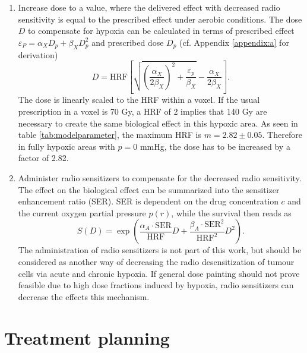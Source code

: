 \begin{enumerate}
\item Increase dose to a value, where the delivered effect with decreased radio sensitivity is equal to the prescribed effect under aerobic conditions. The dose $D$ to compensate for hypoxia can be calculated in terms of prescribed effect $\varepsilon_P = \alpha_XD_p + \beta_XD_p^2$ and prescribed dose $D_p$ (cf. Appendix \ref{appendix:a} for derivation)
\begin{equation}\label{eq:dosecompensation}
D = \mathrm{HRF}\left[\sqrt{\left(\frac{\alpha_X}{2\beta_X}\right)^2 + \frac{\varepsilon_p}{\beta_X}}-\frac{\alpha_X}{2\beta_X}\right].
\end{equation}
The dose is linearly scaled to the HRF within a voxel. If the usual prescription in a voxel is 70 Gy, a HRF of 2 implies that 140 Gy are necessary to create the same biological effect in this hypoxic area. As seen in table \ref{tab:modelparameter}, the maximum HRF is $m=2.82\pm 0.05$. Therefore in fully hypoxic areas with $p=0$ mmHg, the dose has to be increased by a factor of 2.82.
\item Administer radio sensitizers to compensate for the decreased radio sensitivity. The effect on the biological effect can be summarized into the sensitizer enhancement ratio (SER). SER is dependent on the drug concentration $c$ and the current oxygen partial pressure $p(r)$, while the survival then reads as \cite{pmid21183291}
\begin{equation}
S(D) = \exp\left(\frac{\alpha_A\cdot\mathrm{SER}}{\mathrm{HRF}}D + \frac{\beta_A\cdot\mathrm{SER}^2}{\mathrm{HRF}^2}D^2\right).
\end{equation}
The administration of radio sensitizers is not part of this work, but should be considered as another way of decreasing the radio desensitization of tumour cells via acute and chronic hypoxia. If general dose painting should not prove feasible due to high dose fractions induced by hypoxia, radio sensitizers can decrease the effects this mechanism.
\end{enumerate}
\section{Treatment planning}
